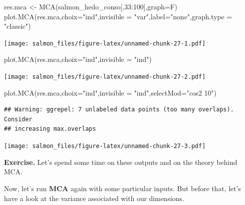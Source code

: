 \documentclass[
]{book}
\newenvironment{Shaded}{\begin{snugshade}}{\end{snugshade}}
\newcommand{\AttributeTok}[1]{\textcolor[rgb]{0.77,0.63,0.00}{#1}}
\newcommand{\DecValTok}[1]{\textcolor[rgb]{0.00,0.00,0.81}{#1}}
\newcommand{\FunctionTok}[1]{\textcolor[rgb]{0.00,0.00,0.00}{#1}}
\newcommand{\NormalTok}[1]{#1}
\newcommand{\OtherTok}[1]{\textcolor[rgb]{0.56,0.35,0.01}{#1}}
\newcommand{\SpecialCharTok}[1]{\textcolor[rgb]{0.00,0.00,0.00}{#1}}
\newcommand{\StringTok}[1]{\textcolor[rgb]{0.31,0.60,0.02}{#1}}
\begin{document}
\begin{Shaded}
\begin{Highlighting}[]
\NormalTok{res.mca }\OtherTok{\textless{}{-}} \FunctionTok{MCA}\NormalTok{(salmon\_hedo\_conso[,}\DecValTok{33}\SpecialCharTok{:}\DecValTok{100}\NormalTok{],}\AttributeTok{graph=}\NormalTok{F)}
\FunctionTok{plot.MCA}\NormalTok{(res.mca,}\AttributeTok{choix=}\StringTok{"ind"}\NormalTok{,}\AttributeTok{invisible =} \StringTok{"var"}\NormalTok{,}\AttributeTok{label=}\StringTok{"none"}\NormalTok{,}\AttributeTok{graph.type =} \StringTok{"classic"}\NormalTok{)}
\end{Highlighting}
\end{Shaded}

\texttt{[image: salmon\_files/figure-latex/unnamed-chunk-27-1.pdf]}

\begin{Shaded}
\begin{Highlighting}[]
\FunctionTok{plot.MCA}\NormalTok{(res.mca,}\AttributeTok{choix=}\StringTok{"ind"}\NormalTok{,}\AttributeTok{invisible =} \StringTok{"ind"}\NormalTok{)}
\end{Highlighting}
\end{Shaded}

\texttt{[image: salmon\_files/figure-latex/unnamed-chunk-27-2.pdf]}

\begin{Shaded}
\begin{Highlighting}[]
\FunctionTok{plot.MCA}\NormalTok{(res.mca,}\AttributeTok{choix=}\StringTok{"ind"}\NormalTok{,}\AttributeTok{invisible =} \StringTok{"ind"}\NormalTok{,}\AttributeTok{selectMod=}\StringTok{"cos2 10"}\NormalTok{)}
\end{Highlighting}
\end{Shaded}

\begin{verbatim}
## Warning: ggrepel: 7 unlabeled data points (too many overlaps). Consider
## increasing max.overlaps
\end{verbatim}

\texttt{[image: salmon\_files/figure-latex/unnamed-chunk-27-3.pdf]}

\textbf{Exercise. }Let's spend some time on these outputs and on the theory behind MCA.

Now, let's run \textbf{MCA} again with some particular inputs. But before that, let's have a look at the variance associated with our dimensions.

\begin{Shaded}
\end{Shaded}
\end{document}
